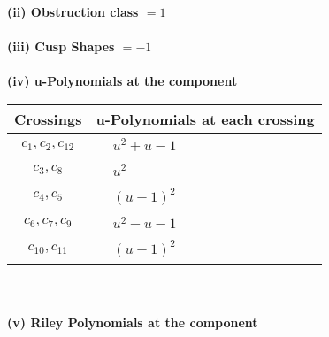 \documentclass[1p]{elsarticle_modified}
\theoremstyle{definition}
\begin{document}
\flushleft \textbf{(ii) Obstruction class $= 1$}\\~\\
\flushleft \textbf{(iii) Cusp Shapes $= -1$}\\~\\
\newpage\renewcommand{\arraystretch}{1}
\flushleft \textbf{(iv) u-Polynomials at the component}\newline \\
\begin{tabular}{m{50pt}|m{274pt}}
Crossings & \hspace{64pt}u-Polynomials at each crossing \\
\hline $$\begin{aligned}c_{1},c_{2},c_{12}\end{aligned}$$&$\begin{aligned}
&u^2+u-1
\end{aligned}$\\
\hline $$\begin{aligned}c_{3},c_{8}\end{aligned}$$&$\begin{aligned}
&u^2
\end{aligned}$\\
\hline $$\begin{aligned}c_{4},c_{5}\end{aligned}$$&$\begin{aligned}
&(u+1)^2
\end{aligned}$\\
\hline $$\begin{aligned}c_{6},c_{7},c_{9}\end{aligned}$$&$\begin{aligned}
&u^2- u-1
\end{aligned}$\\
\hline $$\begin{aligned}c_{10},c_{11}\end{aligned}$$&$\begin{aligned}
&(u-1)^2
\end{aligned}$\\
\hline
\end{tabular}\\~\\
\newpage\renewcommand{\arraystretch}{1}
\flushleft \textbf{(v) Riley Polynomials at the component}\newline \\
\end{document}
